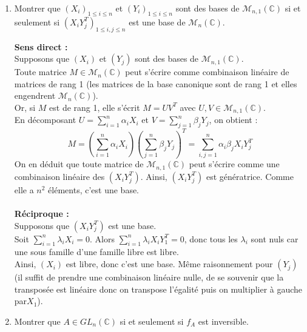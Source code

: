 \documentclass[a4paper,12pt]{article}
\begin{document}
        \begin{enumerate}
        \item Montrer que \((X_i)_{1 \leq i \leq n}\) et \((Y_i)_{1 \leq i \leq n}\) sont des bases de \(\mathcal{M}_{n,1}(\mathbb{C})\) si et seulement si \((X_i Y_j^T)_{1 \leq i,j \leq n}\) est une base de \(\mathcal{M}_n(\mathbb{C})\).
        
        \begin{correctionbox}
        \textbf{Sens direct :} \\
        Supposons que \((X_i)\) et \((Y_j)\) sont des bases de \(\mathcal{M}_{n,1}(\mathbb{C})\). \\
        Toute matrice \(M \in \mathcal{M}_n(\mathbb{C})\) peut s'écrire comme combinaison linéaire de matrices de rang 1 (les matrices de la base canonique sont de rang 1 et elles engendrent \(\mathcal{M}_{n}(\mathbb{C})\)). \\
        Or, si \(M\) est de rang 1, elle s'écrit \(M = UV^T\) avec \(U,V \in \mathcal{M}_{n,1}(\mathbb{C})\). \\
        En décomposant \(U = \sum_{i=1}^n \alpha_i X_i\) et \(V = \sum_{j=1}^n \beta_j Y_j\), on obtient :
        \[
        M = \left(\sum_{i=1}^n \alpha_i X_i\right)\left(\sum_{j=1}^n \beta_j Y_j\right)^T = \sum_{i,j=1}^n \alpha_i \beta_j X_i Y_j^T
        \]
        On en déduit que toute matrice de \(\mathcal{M}_{n,1}(\mathbb{C})\) peut s'écrire comme une combinaison linéaire des \((X_i Y_j^T)\). Ainsi, \((X_i Y_j^T)\) est génératrice. Comme elle a \(n^2\) éléments, c'est une base. \\\\ \textbf{Réciproque :} \\
        Supposons que \((X_i Y_j^T)\) est une base. \\
        Soit \(\sum_{i=1}^n \lambda_i X_i = 0\). Alors \( \sum_{i=1}^n \lambda_i X_i Y_1^T = 0\), donc tous les \(\lambda_i\) sont nuls car une sous famille d'une famille libre est libre. \\
        Ainsi, \((X_i)\) est libre, donc c'est une base. Même raisonnement pour \((Y_j)\) (il suffit de prendre une combinaison linéaire nulle, de se souvenir que la transposée est linéaire donc on transpose l'égalité puis on multiplier à gauche par\(X_1\)).
        \end{correctionbox}
        
        \item Montrer que \(A \in GL_n(\mathbb{C})\) si et seulement si \(f_A\) est inversible.
        

\end{enumerate}
\end{document}
